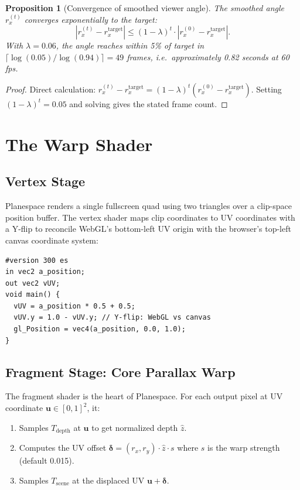 \documentclass[10pt,twocolumn]{article}
\newtheorem{proposition}[theorem]{Proposition}
\newcommand{\normz}{\hat{z}}
\newcommand{\rx}{r_x}
\newcommand{\ry}{r_y}
\newcommand{\UV}{\mathbf{u}}
\newcommand{\offset}{\boldsymbol{\delta}}
\newcommand{\Tscene}{T_{\mathrm{scene}}}
\newcommand{\Tdepth}{T_{\mathrm{depth}}}
\begin{document}
\begin{proposition}[Convergence of smoothed viewer angle]
The smoothed angle $r_x^{(t)}$ converges exponentially to the target:
\[
  |r_x^{(t)} - r_x^{\mathrm{target}}| \le (1 - \lambda)^t \cdot |r_x^{(0)} - r_x^{\mathrm{target}}|.
\]
With $\lambda = 0.06$, the angle reaches within 5\% of target in
$\lceil \log(0.05) / \log(0.94) \rceil = 49$ frames, i.e.\ approximately
0.82 seconds at 60\,fps.
\end{proposition}

\begin{proof}
Direct calculation: $r_x^{(t)} - r_x^{\mathrm{target}}
= (1-\lambda)^t (r_x^{(0)} - r_x^{\mathrm{target}})$.
Setting $(1-\lambda)^t = 0.05$ and solving gives the stated frame count.
\end{proof}

\section{The Warp Shader}
\label{sec:shader}

\subsection{Vertex Stage}

Planespace renders a single fullscreen quad using two triangles over a
clip-space position buffer. The vertex shader maps clip coordinates to UV
coordinates with a Y-flip to reconcile WebGL's bottom-left UV origin with
the browser's top-left canvas coordinate system:

\begin{lstlisting}[style=glsl,caption={Vertex shader.}]
#version 300 es
in vec2 a_position;
out vec2 vUV;
void main() {
  vUV = a_position * 0.5 + 0.5;
  vUV.y = 1.0 - vUV.y; // Y-flip: WebGL vs canvas
  gl_Position = vec4(a_position, 0.0, 1.0);
}
\end{lstlisting}

\subsection{Fragment Stage: Core Parallax Warp}

The fragment shader is the heart of Planespace. For each output pixel at
UV coordinate $\UV \in [0,1]^2$, it:

\begin{enumerate}[topsep=2pt]
  \item Samples $\Tdepth$ at $\UV$ to get normalized depth $\normz$.
  \item Computes the UV offset $\offset = (\rx, \ry) \cdot \normz \cdot s$
        where $s$ is the warp strength (default 0.015).
  \item Samples $\Tscene$ at the displaced UV $\UV + \offset$.
\end{enumerate}
\end{document}
